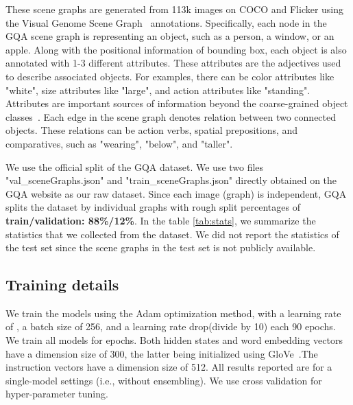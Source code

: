 \documentclass[11pt]{article}
\begin{document}
These scene graphs are generated from 113k images on COCO and Flicker using the Visual Genome Scene Graph~\cite{Genome} annotations. 
Specifically, each node in the GQA scene graph is representing an object, such as a person, a window, or an apple. Along with the positional information of bounding box, each object is also annotated with 1-3 different attributes. 
These attributes are the adjectives used to describe associated objects. For examples, there can be color attributes like "white", size attributes like "large", and action attributes like "standing". Attributes are important sources of information beyond the coarse-grained object classes~\cite{liang-etal-2020-alice}. 
Each edge in the scene graph denotes relation between two connected objects. These relations can be action verbs, spatial prepositions, and comparatives, such as "wearing", "below", and "taller". 

We use the official split of the GQA dataset. 
We use two files "val\_sceneGraphs.json" and "train\_sceneGraphs.json" directly obtained on the GQA website as our raw dataset. 
Since each image (graph) is independent, GQA splits the dataset by individual graphs with rough split percentages of \textbf{ train/validation: 88\%/12\%}. 
In the table \ref{tab:stats}, we summarize the statistics that we collected from the dataset. 
We did not report the statistics of the test set since the scene graphs in the test set is not publicly available. 



\subsection{Training details}
We train the models using the Adam optimization method, with a learning rate of , a batch size of 256, and a learning rate drop(divide by 10) each 90 epochs. We train all models for  epochs. 
Both hidden states and word embedding vectors have a dimension size of 300, the latter being initialized using GloVe~\cite{glove}.The instruction vectors have a dimension size of 512. All results reported are for a single-model settings (i.e., without ensembling). We use cross validation for hyper-parameter tuning.


 
\end{document}
